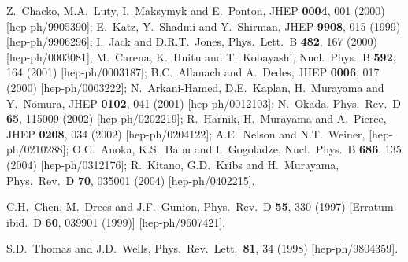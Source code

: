 \documentclass[11pt]{article}
\begin{document}
\begin{thebibliography}{999}
Z.~Chacko, M.A.~Luty, I.~Maksymyk and E.~Ponton,
  JHEP {\bf 0004}, 001 (2000)
  [hep-ph/9905390];
E.~Katz, Y.~Shadmi and Y.~Shirman,
  JHEP {\bf 9908}, 015 (1999)
  [hep-ph/9906296];
I.~Jack and D.R.T.~Jones,
  Phys.\ Lett.\ B {\bf 482}, 167 (2000)
  [hep-ph/0003081];
M.~Carena, K.~Huitu and T.~Kobayashi,
  Nucl.\ Phys.\ B {\bf 592}, 164 (2001)
  [hep-ph/0003187];
B.C.~Allanach and A.~Dedes,
  JHEP {\bf 0006}, 017 (2000)
  [hep-ph/0003222];
N.~Arkani-Hamed, D.E.~Kaplan, H.~Murayama and Y.~Nomura,
  JHEP {\bf 0102}, 041 (2001)
  [hep-ph/0012103];
N.~Okada,
  Phys.\ Rev.\ D {\bf 65}, 115009 (2002)
  [hep-ph/0202219];
R.~Harnik, H.~Murayama and A.~Pierce,
  JHEP {\bf 0208}, 034 (2002)
  [hep-ph/0204122];
A.E.~Nelson and N.T.~Weiner,
  [hep-ph/0210288];
O.C.~Anoka, K.S.~Babu and I.~Gogoladze,
  Nucl.\ Phys.\ B {\bf 686}, 135 (2004)
  [hep-ph/0312176];
R.~Kitano, G.D.~Kribs and H.~Murayama,
  Phys.\ Rev.\ D {\bf 70}, 035001 (2004)
  [hep-ph/0402215].

C.H.~Chen, M.~Drees and J.F.~Gunion,
  Phys.\ Rev.\ D {\bf 55}, 330 (1997)
  [Erratum-ibid.\ D {\bf 60}, 039901 (1999)]
  [hep-ph/9607421].

  S.D.~Thomas and J.D.~Wells,
  Phys.\ Rev.\ Lett.\  {\bf 81}, 34 (1998)
  [hep-ph/9804359].
  

\end{thebibliography}
\end{document}
